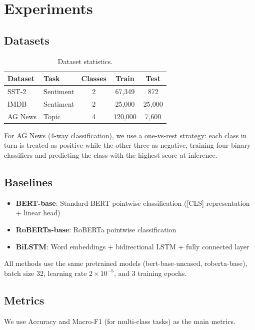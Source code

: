 \documentclass[11pt, a4paper]{article}
\begin{document}
\section{Experiments}

\subsection{Datasets}

\begin{table}[htbp]
\centering
\caption{Dataset statistics.}
\label{tab:datasets}
\begin{tabular}{llccc}
\toprule
Dataset & Task & Classes & Train & Test \\
\midrule
SST-2 & Sentiment & 2 & 67,349 & 872 \\
IMDB & Sentiment & 2 & 25,000 & 25,000 \\
AG News & Topic & 4 & 120,000 & 7,600 \\
\bottomrule
\end{tabular}
\end{table}

For AG News (4-way classification), we use a one-vs-rest strategy: each class in turn is treated as positive while the other three as negative, training four binary classifiers and predicting the class with the highest score at inference.

\subsection{Baselines}

\begin{itemize}
    \item \textbf{BERT-base}: Standard BERT pointwise classification ([CLS] representation + linear head)
    \item \textbf{RoBERTa-base}: RoBERTa pointwise classification
    \item \textbf{BiLSTM}: Word embeddings + bidirectional LSTM + fully connected layer
\end{itemize}

All methods use the same pretrained models (bert-base-uncased, roberta-base), batch size 32, learning rate $2 \times 10^{-5}$, and 3 training epochs.

\subsection{Metrics}

We use Accuracy and Macro-F1 (for multi-class tasks) as the main metrics.
\end{document}
